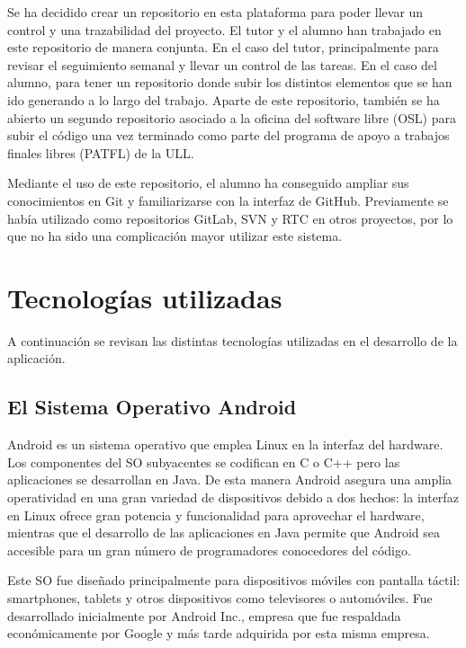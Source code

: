 Se ha decidido crear un repositorio en esta plataforma para poder llevar un control y una trazabilidad del proyecto. El tutor y el alumno han trabajado en este repositorio de manera conjunta. En el caso del tutor, principalmente para revisar el seguimiento semanal y llevar un control de las tareas. En el caso del alumno, para tener un repositorio donde subir los distintos elementos que se han ido generando a lo largo del trabajo. Aparte de este repositorio, también se ha abierto un segundo repositorio \cite{URL::repositorioAplicacion} asociado a la oficina del software libre (OSL) para subir el código una vez terminado como parte del programa de apoyo a trabajos finales libres (PATFL) \cite{URL::PATFL} de la ULL.


Mediante el uso de este repositorio, el alumno ha conseguido ampliar sus conocimientos en Git y familiarizarse con la interfaz de GitHub. Previamente se había utilizado como repositorios GitLab, SVN y RTC en otros proyectos, por lo que no ha sido una complicación mayor utilizar este sistema.

\section{Tecnologías utilizadas}

A continuación se revisan las distintas tecnologías utilizadas en el desarrollo de la aplicación.

\subsection{El Sistema Operativo Android}

Android es un sistema operativo que emplea Linux en la interfaz del hardware.  Los componentes del SO subyacentes se codifican en C o C++ pero las aplicaciones se desarrollan en Java. De esta manera Android asegura una amplia operatividad en una gran variedad de dispositivos debido a dos hechos: la interfaz en Linux ofrece gran potencia y funcionalidad para aprovechar el hardware, mientras que el desarrollo de las aplicaciones en Java permite que Android sea accesible para un gran número de programadores conocedores del código.

Este SO fue diseñado principalmente para dispositivos móviles con pantalla táctil: smartphones, tablets y otros dispositivos como televisores o automóviles. Fue desarrollado inicialmente por Android Inc., empresa que fue respaldada económicamente por Google y más tarde adquirida por esta misma empresa.

